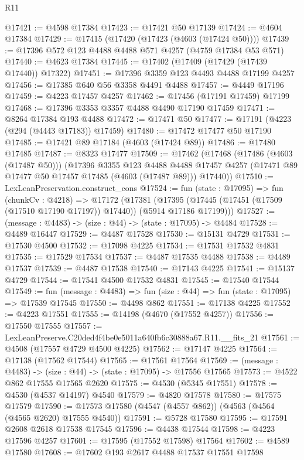 \begin{lexlean}{R11}
\begin{coremodule}
@17421 := @4598 @17384
@17423 := @17421 @50 @17139
@17424 := @4604 @17384
@17429 := @17415 (@17420 (@17423 (@4603 (@17424 @50))))
@17439 := @17396 @572 @123 @4488 @4488 @571 @4257 (@4759 @17384 @53 @571)
@17440 := @4623 @17384
@17445 := @17402 (@17409 (@17429 (@17439 @17440)) @17322)
@17451 := @17396 @3359 @123 @4493 @4488 @17199 @4257
@17456 := @17385 @640 @56 @3358 @4491 @4488
@17457 := @4449 @17196
@17459 := @4223 @17457 @4257
@17462 := @17456 (@17191 @17459) @17199
@17468 := @17396 @3353 @3357 @4488 @4490 @17190 @17459
@17471 := @8264 @17384 @193 @4488
@17472 := @17471 @50
@17477 := @17191 (@4223 (@294 (@4443 @17183)) @17459)
@17480 := @17472 @17477 @50 @17190
@17485 := @17421 @89 @17184 (@4603 (@17424 @89))
@17486 := @17480 @17485
@17487 := @8323 @17477
@17509 := @17462
    (@17468
      (@17486 (@4603 (@17487 @50)))
      (@17396
        @3355
        @123
        @4488
        @4488
        @17457
        @4257
        (@17471 @89 @17477 @50 @17457 @17485 (@4603 (@17487 @89)))
        @17440))
@17510 := LexLeanPreservation.construct_cons
@17524 := fun (state : @17095) =>
  fun (chunkCv : @4218) =>
  @17172
    (@17381 (@17395 (@17445 (@17451 (@17509 (@17510 @17190 @17197)) @17440)) (@5914 @17186 @17199)))
@17527 := (message : @4483) -> (size : @44) -> (state : @17095) -> @4484
@17528 := @4489 @16447
@17529 := @4487 @17528
@17530 := @15131 @4729
@17531 := @17530 @4500
@17532 := @17098 @4225
@17534 := @17531 @17532 @4831
@17535 := @17529 @17534
@17537 := @4487 @17535 @4488
@17538 := @4489 @17537
@17539 := @4487 @17538
@17540 := @17143 @4225
@17541 := @15137 @4729
@17544 := @17541 @4500 @17532 @4831
@17545 := @17540 @17544
@17549 := fun (message : @4483) => fun (size : @44) => fun (state : @17095) => @17539 @17545
@17550 := @4498 @862
@17551 := @17138 @4225
@17552 := @4223 @17551
@17555 := @14198 (@4670 (@17552 @4257))
@17556 := @17550 @17555
@17557 := LexLeanPreserve.C20ded4f4be0e5011a640fb6c30888a67.R11.__fits_21
@17561 := @4508 (@17557 @4729 @4500 @4225)
@17562 := @17147 @4225
@17564 := @17138 (@17562 @17544)
@17565 := @17561 @17564
@17569 := (message : @4483) -> (size : @44) -> (state : @17095) -> @17556 @17565
@17573 := @4522 @862 @17555 @17565 @2620
@17575 := @4530 (@5345 @17551)
@17578 := @4530 (@4537 @14197) @4540
@17579 := @4820 @17578
@17580 := @17575 @17579
@17590 := @17573 @17580 (@4547 (@4557 @862)) (@4563 (@4564 (@4565 @2620) @17555 @4540))
@17591 := @5728 @17580
@17595 := @17591 @2608 @2618 @17538 @17545
@17596 := @4438 @17544
@17598 := @4223 @17596 @4257
@17601 := @17595 (@17552 @17598) @17564
@17602 := @4589 @17580
@17608 := @17602 @193 @2617 @4488 @17537 @17551 @17598

\end{coremodule}
\end{lexlean}
